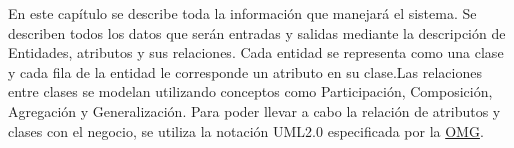 	En este capítulo se describe toda la información que manejará el sistema. Se describen todos los datos que serán entradas y salidas mediante la descripción de Entidades, atributos y sus relaciones. Cada entidad se representa como una clase y cada fila de la entidad le corresponde un atributo en su clase.Las relaciones entre clases se modelan utilizando conceptos como
	Participación, Composición, Agregación y Generalización. Para poder llevar a cabo la relación de atributos y clases con el negocio, se utiliza la notación UML2.0 especificada por la \href{www.omg.org}{OMG}.








